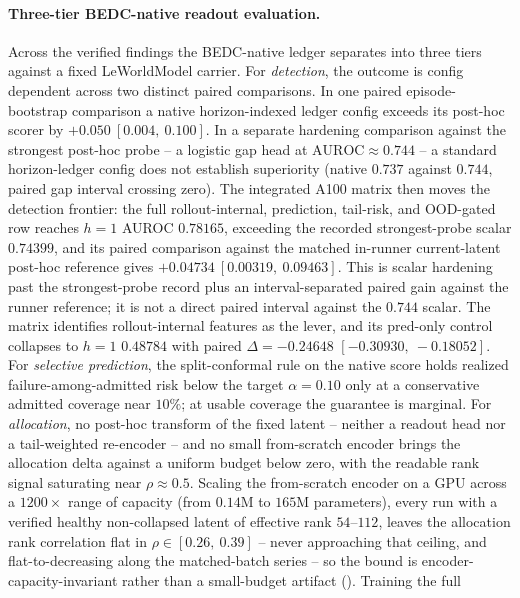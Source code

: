 \paragraph{Three-tier BEDC-native readout evaluation.}
Across the verified findings the BEDC-native ledger separates into three tiers
against a fixed LeWorldModel carrier.  For \emph{detection}, the outcome is
config dependent across two distinct paired comparisons.  In one paired
episode-bootstrap comparison a native horizon-indexed ledger config exceeds its
post-hoc scorer by $+0.050\ [0.004,\ 0.100]$.  In a separate hardening
comparison against the strongest post-hoc probe -- a logistic gap head at
$\mathrm{AUROC} \approx 0.744$ -- a standard horizon-ledger config does not
establish superiority (native $0.737$ against $0.744$, paired gap interval
crossing zero).  The integrated A100 matrix then moves the detection frontier:
the full rollout-internal, prediction, tail-risk, and OOD-gated row reaches
$h=1$ AUROC $0.78165$, exceeding the recorded strongest-probe scalar $0.74399$,
and its paired comparison against the matched in-runner current-latent post-hoc
reference gives $+0.04734\ [0.00319,\ 0.09463]$.  This is scalar hardening past
the strongest-probe record plus an interval-separated paired gain against the
runner reference; it is not a direct paired interval against the $0.744$ scalar.
The matrix identifies rollout-internal features as the lever, and its pred-only
control collapses to $h=1$ $0.48784$ with paired $\Delta=-0.24648$
$[-0.30930,\ -0.18052]$.  For \emph{selective prediction},
the split-conformal rule on the native score holds realized
failure-among-admitted risk below the target $\alpha = 0.10$ only at a
conservative admitted coverage near $10\%$; at usable coverage the guarantee is
marginal.  For \emph{allocation}, no post-hoc transform of the fixed latent --
neither a readout head nor a tail-weighted re-encoder -- and no small
from-scratch encoder brings the allocation delta against a uniform budget below
zero, with the readable rank signal saturating near $\rho \approx 0.5$.  Scaling
the from-scratch encoder on a GPU across a $1200\times$ range of capacity (from
$0.14$M to $165$M parameters), every run with a verified healthy non-collapsed
latent of effective rank $54$--$112$, leaves the allocation rank correlation
flat in $\rho \in [0.26,\ 0.39]$ -- never approaching that ceiling, and
flat-to-decreasing along the matched-batch series -- so the bound is
encoder-capacity-invariant rather than a small-budget artifact
().  Training the full
